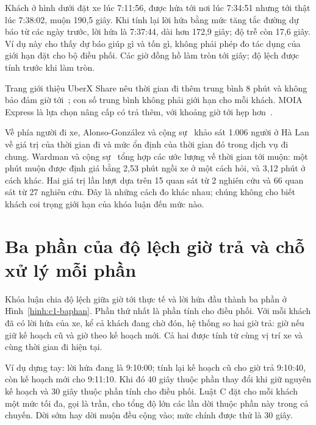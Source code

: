 Khách ở hình dưới đặt xe lúc 7:11:56, được hứa tới nơi lúc 7:34:51 nhưng tới thật lúc 7:38:02, muộn 190,5 giây.
Khi tính lại lời hứa bằng mức tăng tắc đường dự báo từ các ngày trước, lời hứa là 7:37:44, dài hơn 172,9 giây;
độ trễ còn 17,6 giây. Ví dụ này cho thấy dự báo giúp gì và tốn gì, không phải phép đo tác dụng của giới hạn
đặt cho bộ điều phối. Các giờ đồng hồ làm tròn tới giây; độ lệch được tính trước khi làm tròn.

Trang giới thiệu UberX Share nêu thời gian đi thêm trung bình 8 phút và không bảo đảm giờ
tới~\cite{uberxshare}; con số trung bình không phải giới hạn cho mỗi khách.
MOIA Express là lựa chọn nâng cấp có trả thêm, với khoảng giờ tới hẹp hơn~\cite{moiaexpress}.

Về phía người đi xe, Alonso-González và cộng sự~\cite{alonsogonzalez2020} khảo sát 1.006 người ở Hà Lan về giá
trị của thời gian đi và mức ổn định của thời gian đó trong dịch vụ đi chung. Wardman và cộng sự~\cite{wardman2026} tổng hợp các ước lượng về
thời gian tới muộn: một phút muộn được định giá bằng 2,53 phút ngồi xe ở một cách hỏi, và 3,12 phút ở cách khác.
Hai giá trị lần lượt dựa trên 15 quan sát từ 2 nghiên cứu và 66 quan sát từ 27 nghiên cứu. Đây là những cách
đo khác nhau; chúng không cho biết khách coi trọng giới hạn của khóa luận đến mức nào.

\section{Ba phần của độ lệch giờ trả và chỗ xử lý mỗi phần}
\label{muc:c1-cauhoi}

Khóa luận chia độ lệch giữa giờ tới thực tế và lời hứa đầu thành ba phần ở Hình~\ref{hinh:c1-baphan}.
Phần thứ nhất là phần tính cho điều phối. Với mỗi khách đã có lời hứa của xe, kể cả khách đang chờ đón, hệ
thống so hai giờ trả: giờ nếu giữ kế hoạch cũ và giờ theo kế hoạch mới. Cả hai được tính từ cùng vị trí xe
và cùng thời gian đi hiện tại.

Ví dụ dựng tay: lời hứa đang là 9:10:00; tính lại kế hoạch cũ cho giờ trả 9:10:40, còn kế hoạch mới cho
9:11:10. Khi đó 40 giây thuộc phần thay đổi khi giữ nguyên kế hoạch và 30 giây thuộc phần tính cho điều phối.
Luật C đặt cho mỗi khách một mức tối đa, gọi là trần, cho tổng độ lớn các lần dời thuộc phần này trong cả
chuyến. Dời sớm hay dời muộn đều cộng vào; mức chính được thử là 30 giây.

